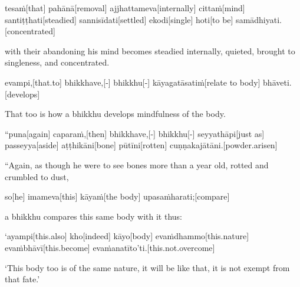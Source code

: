 \begin{samepage}
\begingl[glneveryline={\PaliGlossA,\PaliGlossB}]
tesaṁ[that] pahānā[removal] ajjhattameva[internally] cittaṁ[mind] santiṭṭhati[steadied] sannisīdati[settled] ekodi[single] hoti[to be] samādhiyati.[concentrated]
\endgl
\nopagebreak
\linespread{0.5}
\begin{spacin}{0.2}
{\PaliGlossFT with their abandoning his mind becomes steadied internally, quieted, brought to singleness, and concentrated.}
\end{spacin}
\vskip 12pt
\end{samepage}
\begin{samepage}
\begingl[glneveryline={\PaliGlossA,\PaliGlossB}]
evampi,[that.to] bhikkhave,[-] bhikkhu[-] kāyagatāsatiṁ[relate to body] bhāveti.[develops]
\endgl
\nopagebreak
\linespread{0.5}
\begin{spacin}{0.2}
{\PaliGlossFT That too is how a bhikkhu develops mindfulness of the body.}
\end{spacin}
\vskip 12pt
\end{samepage}
\vskip 0.2in
\begin{samepage}
\begingl[glneveryline={\PaliGlossA,\PaliGlossB}]
“puna[again] caparaṁ,[then] bhikkhave,[-] bhikkhu[-] seyyathāpi[just as] passeyya[aside] aṭṭhikāni[bone] pūtīni[rotten] cuṇṇakajātāni.[powder.arisen]
\endgl
\nopagebreak
\linespread{0.5}
\begin{spacin}{0.2}
{\PaliGlossFT “Again, as though he were to see bones more than a year old, rotted and crumbled to dust,}
\end{spacin}
\vskip 12pt
\end{samepage}
\begin{samepage}
\begingl[glneveryline={\PaliGlossA,\PaliGlossB}]
so[he] imameva[this] kāyaṁ[the body] upasaṁharati;[compare]
\endgl
\nopagebreak
\linespread{0.5}
\begin{spacin}{0.2}
{\PaliGlossFT a bhikkhu compares this same body with it thus:}
\end{spacin}
\vskip 12pt
\end{samepage}
\begin{samepage}
\begingl[glneveryline={\PaliGlossA,\PaliGlossB}]
‘ayampi[this.also] kho[indeed] kāyo[body] evaṁdhammo[this.nature] evaṁbhāvī[this.become] evaṁanatīto’ti.[this.not.overcome]
\endgl
\nopagebreak
\linespread{0.5}
\begin{spacin}{0.2}
{\PaliGlossFT ‘This body too is of the same nature, it will be like that, it is not exempt from that fate.’}
\end{spacin}
\vskip 12pt
\end{samepage}

